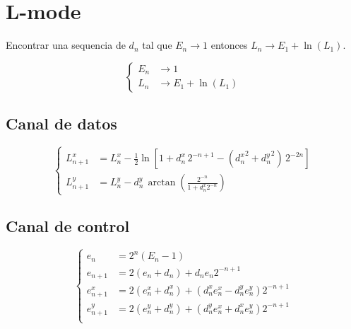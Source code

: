 \documentclass[10pt,a4paper]{book}
\begin{document}
\section{L-mode}
   Encontrar una sequencia de $d_n$ tal que $E_n \rightarrow 1$ entonces $L_n \rightarrow E_1 + \ln(L_1)$.

\begin{equation} \label{eq:bkm_E_mode}
   \left\{
      \begin{aligned}
         E_n & \rightarrow 1 \\
         L_n & \rightarrow E_1 + \ln(L_1)
      \end{aligned}
   \right.
\end{equation}

   \subsection{Canal de datos}
\begin{equation} \label{eq:bkm_eqs_L}
   \left\{
      \begin{aligned}
         L_{n+1}^x &= L_n^x - \frac{1}{2} \ln[ 1 + d_n^x \, 2^{-n+1} - ({d_n^x}^2 + {d_n^y}^2) \, 2^{-2n} ] \\
         L_{n+1}^y &= L_n^y - d_n^y \, \arctan{ \left( \frac{2^{-n}}{1+d_n^x 2^{-n}} \right) }
      \end{aligned}
   \right.
\end{equation}

   \subsection{Canal de control}
\begin{equation} \label{eq:bkm_eqs_e}
   \left\{
      \begin{aligned}
         e_n         &= 2^n (E_n - 1)                                            \\
         e_{n+1}     &= 2 (e_n   + d_n) + d_n e_n 2^{-n+1}                       \\
         e_{n+1}^x   &= 2 (e_n^x + d_n^x) + (d_n^x e_n^x - d_n^y e_n^y) 2^{-n+1} \\
         e_{n+1}^y   &= 2 (e_n^y + d_n^y) + (d_n^y e_n^x + d_n^x e_n^y) 2^{-n+1} \\
      \end{aligned}
   \right.
\end{equation}
\end{document}
